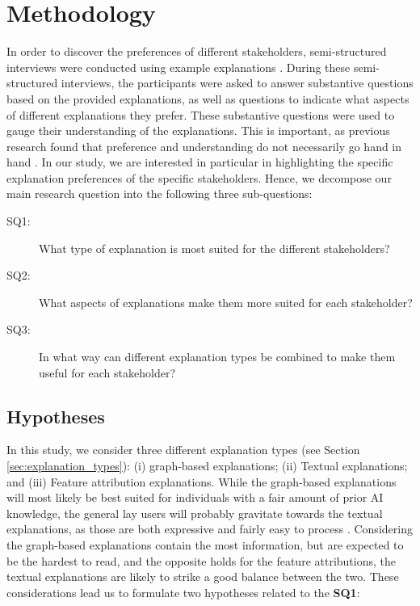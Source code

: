 \section{Methodology}

In order to discover the preferences of different stakeholders, semi-structured interviews were conducted using example explanations \cite{garcia2018mixed}. During these semi-structured interviews, the participants were asked to answer substantive questions based on the provided explanations, as well as questions to indicate what aspects of different explanations they prefer. These substantive questions were used to gauge their understanding of the explanations. This is important, as previous research found that preference and understanding do not necessarily go hand in hand \cite{szymanski2021visual}. In our study, we are interested in particular in highlighting the specific explanation preferences of the specific stakeholders. Hence, we decompose our main research question into the following three sub-questions:

\begin{description}
    \item[SQ1:] What type of explanation is most suited for the different stakeholders?
    \item[SQ2:] What aspects of explanations make them more suited for each stakeholder?
    \item[SQ3:] In what way can different explanation types be combined to make them useful for each stakeholder?
\end{description}


\subsection{Hypotheses}

In this study, we consider three different explanation types (see Section \ref{sec:explanation_types}): (i) graph-based explanations; (ii) Textual explanations; and (iii) Feature attribution explanations. While the graph-based explanations will most likely be best suited for individuals with a fair amount of prior AI knowledge, the general lay users will probably gravitate towards the textual explanations, as those are both expressive and fairly easy to process \cite{purificato2021evaluating}. Considering the graph-based explanations contain the most information, but are expected to be the hardest to read, and the opposite holds for the feature attributions, the textual explanations are likely to strike a good balance between the two. These considerations lead us to formulate two hypotheses related to the \textbf{SQ1}:

